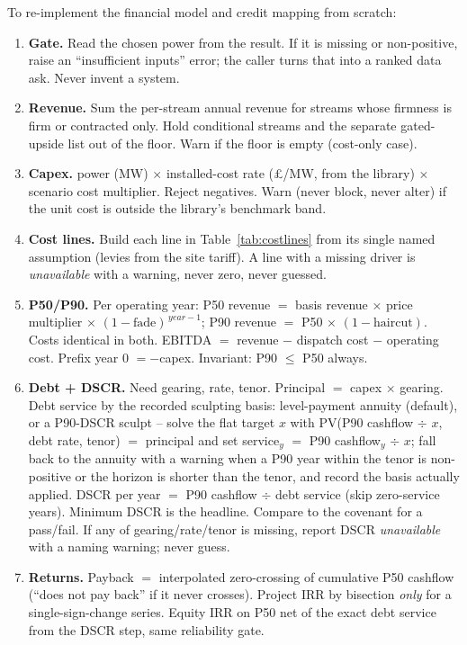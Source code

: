 \begin{rebuild}
To re-implement the financial model and credit mapping from scratch:
\begin{enumerate}
  \item \textbf{Gate.} Read the chosen power from the result. If it is missing or non-positive, raise an ``insufficient inputs'' error; the caller turns that into a ranked data ask. Never invent a system.
  \item \textbf{Revenue.} Sum the per-stream annual revenue for streams whose firmness is firm or contracted only. Hold conditional streams and the separate gated-upside list out of the floor. Warn if the floor is empty (cost-only case).
  \item \textbf{Capex.} power (MW) $\times$ installed-cost rate (\pounds/MW, from the library) $\times$ scenario cost multiplier. Reject negatives. Warn (never block, never alter) if the unit cost is outside the library's benchmark band.
  \item \textbf{Cost lines.} Build each line in Table~\ref{tab:costlines} from its single named assumption (levies from the site tariff). A line with a missing driver is \emph{unavailable} with a warning, never zero, never guessed.
  \item \textbf{P50/P90.} Per operating year: P50 revenue $=$ basis revenue $\times$ price multiplier $\times$ $(1-\text{fade})^{\,year-1}$; P90 revenue $=$ P50 $\times$ $(1-\text{haircut})$. Costs identical in both. EBITDA $=$ revenue $-$ dispatch cost $-$ operating cost. Prefix year 0 $= -$capex. Invariant: P90 $\le$ P50 always.
  \item \textbf{Debt + DSCR.} Need gearing, rate, tenor. Principal $=$ capex $\times$ gearing. Debt service by the recorded sculpting basis: level-payment annuity (default), or a P90-DSCR sculpt -- solve the flat target $x$ with PV(P90 cashflow $\div$ $x$, debt rate, tenor) $=$ principal and set service$_y$ $=$ P90 cashflow$_y$ $\div$ $x$; fall back to the annuity with a warning when a P90 year within the tenor is non-positive or the horizon is shorter than the tenor, and record the basis actually applied. DSCR per year $=$ P90 cashflow $\div$ debt service (skip zero-service years). Minimum DSCR is the headline. Compare to the covenant for a pass/fail. If any of gearing/rate/tenor is missing, report DSCR \emph{unavailable} with a naming warning; never guess.
  \item \textbf{Returns.} Payback $=$ interpolated zero-crossing of cumulative P50 cashflow (``does not pay back'' if it never crosses). Project IRR by bisection \emph{only} for a single-sign-change series. Equity IRR on P50 net of the exact debt service from the DSCR step, same reliability gate.

\end{enumerate}
\end{rebuild}
